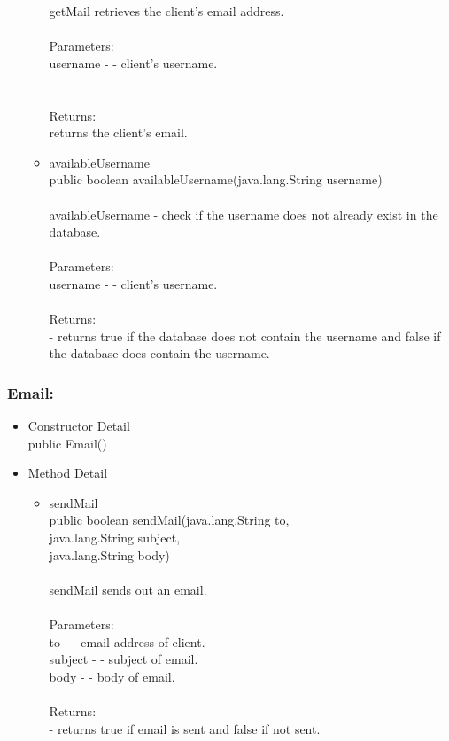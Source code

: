 \documentclass[letterpaper]{article}
\begin{document}
\begin{itemize}
\begin{itemize}
											getMail retrieves the client's email address. \\ \\
											Parameters: \\
											username - - client's username. \\ \\ \\
											Returns: \\
											returns the client's email.
									\item	availableUsername \\
											public boolean availableUsername(java.lang.String username) \\ \\
											availableUsername - check if the username does not already exist in the database. \\ \\
											Parameters: \\
											username - - client's username. \\ \\
											Returns: \\
											- returns true if the database does not contain the username and false if the database does contain the username.
								\end{itemize}
					\end{itemize}
					
				\vspace{0.2in}
				\subsubsection*{Email:}
				\vspace{0.1in}	
					\begin{itemize}
						\item	Constructor Detail \\
								public Email()
						\item	Method Detail
								\begin{itemize}
									\item	sendMail \\
											public boolean sendMail(java.lang.String to, \\
		               java.lang.String subject, \\
		               java.lang.String body) \\ \\
											sendMail sends out an email. \\ \\
											Parameters: \\
											to - - email address of client.	\\
											subject - - subject of email. \\
											body - - body of email. \\ \\
											Returns: \\
											- returns true if email is sent and false if not sent.
								\end{itemize}
					\end{itemize}
		
		\vspace{0.2in}
		
\end{document}
